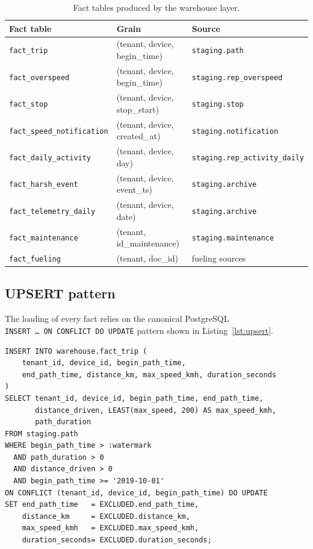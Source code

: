 \begin{table}[h]
\centering
\caption{Fact tables produced by the warehouse layer.}
\label{tab:facts-prep}
\begin{tabular}{|l|l|l|}
\hline
\textbf{Fact table} & \textbf{Grain} & \textbf{Source} \\
\hline
\texttt{fact\_trip} & (tenant, device, begin\_time) & \texttt{staging.path} \\
\texttt{fact\_overspeed} & (tenant, device, begin\_time) & \texttt{staging.rep\_overspeed} \\
\texttt{fact\_stop} & (tenant, device, stop\_start) & \texttt{staging.stop} \\
\texttt{fact\_speed\_notification} & (tenant, device, created\_at) & \texttt{staging.notification} \\
\texttt{fact\_daily\_activity} & (tenant, device, day) & \texttt{staging.rep\_activity\_daily} \\
\texttt{fact\_harsh\_event} & (tenant, device, event\_ts) & \texttt{staging.archive} \\
\texttt{fact\_telemetry\_daily} & (tenant, device, date) & \texttt{staging.archive} \\
\texttt{fact\_maintenance} & (tenant, id\_maintenance) & \texttt{staging.maintenance} \\
\texttt{fact\_fueling} & (tenant, doc\_id) & fueling sources \\
\hline
\end{tabular}
\end{table}

\subsection{UPSERT pattern}
The loading of every fact relies on the canonical PostgreSQL \texttt{INSERT~\dots~ON~CONFLICT~DO~UPDATE} pattern shown in Listing~\ref{lst:upsert}.

\begin{lstlisting}[style=sql,caption={Idempotent upsert into \texttt{fact\_trip}.},label={lst:upsert}]
INSERT INTO warehouse.fact_trip (
    tenant_id, device_id, begin_path_time,
    end_path_time, distance_km, max_speed_kmh, duration_seconds
)
SELECT tenant_id, device_id, begin_path_time, end_path_time,
       distance_driven, LEAST(max_speed, 200) AS max_speed_kmh,
       path_duration
FROM staging.path
WHERE begin_path_time > :watermark
  AND path_duration > 0
  AND distance_driven > 0
  AND begin_path_time >= '2019-10-01'
ON CONFLICT (tenant_id, device_id, begin_path_time) DO UPDATE
SET end_path_time   = EXCLUDED.end_path_time,
    distance_km     = EXCLUDED.distance_km,
    max_speed_kmh   = EXCLUDED.max_speed_kmh,
    duration_seconds= EXCLUDED.duration_seconds;
\end{lstlisting}

